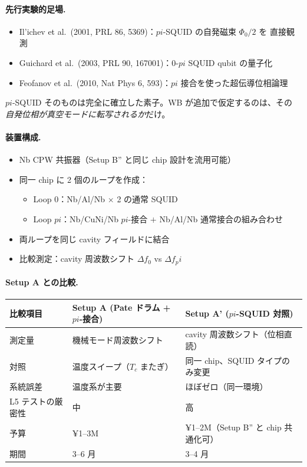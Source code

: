 \documentclass[11pt,a4paper]{article}
\def\pi{pi}%
\def\textbf#1{#1}%
\begin{document}
\paragraph{先行実験的足場.}
\begin{itemize}
\item Il'ichev et al.\ (2001, PRL 86, 5369)：$\pi$-SQUID の自発磁束 $\Phi_0/2$ を
  直接観測
\item Guichard et al.\ (2003, PRL 90, 167001)：0-$\pi$ SQUID qubit の量子化
\item Feofanov et al.\ (2010, Nat Phys 6, 593)：$\pi$ 接合を使った超伝導位相論理
\end{itemize}
$\pi$-SQUID そのものは完全に確立した素子。WB が追加で仮定するのは、その
\emph{自発位相が真空モードに転写されるか}だけ。

\paragraph{装置構成.}
\begin{itemize}
\item Nb CPW 共振器（Setup B'' と同じ chip 設計を流用可能）
\item 同一 chip に 2 個のループを作成：
  \begin{itemize}
  \item Loop 0：Nb/Al/Nb $\times$ 2 の通常 SQUID
  \item Loop $\pi$：Nb/CuNi/Nb $\pi$-接合 $+$ Nb/Al/Nb 通常接合の組み合わせ
  \end{itemize}
\item 両ループを同じ cavity フィールドに結合
\item \textbf{比較測定}：cavity 周波数シフト $\Delta f_0$ vs $\Delta f_\pi$
\end{itemize}

\paragraph{Setup A との比較.}
\begin{center}
\begin{tabular}{lll}
\toprule
比較項目 & Setup A (Pate ドラム + $\pi$-接合) & \textbf{Setup A' ($\pi$-SQUID 対照)} \\
\midrule
測定量 & 機械モード周波数シフト & cavity 周波数シフト（位相直読） \\
対照 & 温度スイープ（$T_c$ またぎ） & 同一 chip、SQUID タイプのみ変更 \\
系統誤差 & 温度系が主要 & \textbf{ほぼゼロ（同一環境）} \\
L5 テストの厳密性 & 中 & \textbf{高} \\
予算 & ¥1--3M & ¥1--2M（Setup B'' と chip 共通化可） \\
期間 & 3--6 月 & 3--4 月 \\
\bottomrule
\end{tabular}
\end{center}
\end{document}
